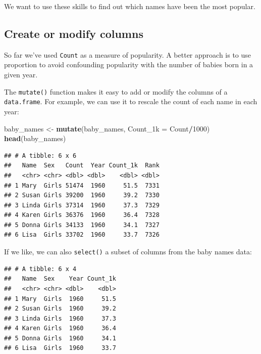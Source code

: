 \documentclass[]{book}
\newenvironment{Shaded}{\begin{snugshade}}{\end{snugshade}}
\newcommand{\DataTypeTok}[1]{\textcolor[rgb]{0.13,0.29,0.53}{#1}}
\newcommand{\DecValTok}[1]{\textcolor[rgb]{0.00,0.00,0.81}{#1}}
\newcommand{\KeywordTok}[1]{\textcolor[rgb]{0.13,0.29,0.53}{\textbf{#1}}}
\newcommand{\NormalTok}[1]{#1}
\newcommand{\OperatorTok}[1]{\textcolor[rgb]{0.81,0.36,0.00}{\textbf{#1}}}
\newcommand{\StringTok}[1]{\textcolor[rgb]{0.31,0.60,0.02}{#1}}
\begin{document}
We want to use these skills to find out which names have been the most popular.

\hypertarget{create-or-modify-columns}{%
\subsection{Create or modify columns}\label{create-or-modify-columns}}

So far we've used \texttt{Count} as a measure of popularity. A better
approach is to use proportion to avoid confounding
popularity with the number of babies born in a given year.

The \texttt{mutate()} function makes it easy to add or modify the columns
of a \texttt{data.frame}. For example, we can use it to rescale the count
of each name in each year:

\begin{Shaded}
\begin{Highlighting}[]
\NormalTok{baby_names <-}\StringTok{ }\KeywordTok{mutate}\NormalTok{(baby_names, }\DataTypeTok{Count_1k =}\NormalTok{ Count}\OperatorTok{/}\DecValTok{1000}\NormalTok{)}
\KeywordTok{head}\NormalTok{(baby_names) }
\end{Highlighting}
\end{Shaded}

\begin{verbatim}
## # A tibble: 6 x 6
##   Name  Sex   Count  Year Count_1k  Rank
##   <chr> <chr> <dbl> <dbl>    <dbl> <dbl>
## 1 Mary  Girls 51474  1960     51.5  7331
## 2 Susan Girls 39200  1960     39.2  7330
## 3 Linda Girls 37314  1960     37.3  7329
## 4 Karen Girls 36376  1960     36.4  7328
## 5 Donna Girls 34133  1960     34.1  7327
## 6 Lisa  Girls 33702  1960     33.7  7326
\end{verbatim}

If we like, we can also \texttt{select()} a subset of columns from the baby names data:

\begin{Shaded}
\end{Shaded}

\begin{verbatim}
## # A tibble: 6 x 4
##   Name  Sex    Year Count_1k
##   <chr> <chr> <dbl>    <dbl>
## 1 Mary  Girls  1960     51.5
## 2 Susan Girls  1960     39.2
## 3 Linda Girls  1960     37.3
## 4 Karen Girls  1960     36.4
## 5 Donna Girls  1960     34.1
## 6 Lisa  Girls  1960     33.7
\end{verbatim}
\end{document}
